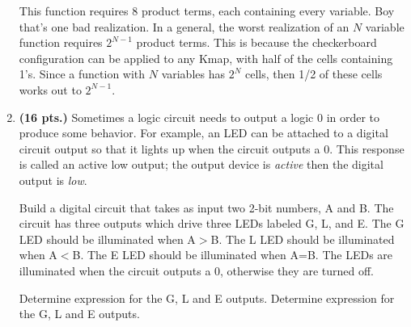 \begin{enumerate}
\begin{solution}
{This function requires 8 product terms, each containing every variable.  Boy that's
one bad realization.  In a general, the worst realization of an $N$ variable function 
requires $2^{N-1}$ product terms.  This is because the checkerboard configuration can
be applied to any Kmap, with half of the cells containing 1's.  Since a function with
$N$ variables has $2^{N}$ cells, then 1/2 of these cells works out to $2^{N-1}$.
} \end{solution} 


\item {\bf (16 pts.)} Sometimes a logic circuit needs to output 
a logic 0 in order to produce some behavior.  For example, an LED can be
attached to a digital circuit output so that it lights up when the circuit
outputs a 0.  This response is called an active low output; the output
device is {\it active} then the digital output is {\it low}.
                                                                                
Build a digital circuit that takes as input two 2-bit numbers,
A and B.  The circuit has three outputs which drive three
LEDs labeled G, L, and E.
The G LED should be illuminated when A$>$B.
The L LED should be illuminated when A$<$B.
The E LED should be illuminated when A=B.
The LEDs are illuminated when the circuit outputs a 0, otherwise
they are turned off.
                                                                                
Determine \SOPmin expression for the G, L and E outputs.
Determine \POSmin expression for the G, L and E outputs.
                                                                                


\end{enumerate}
